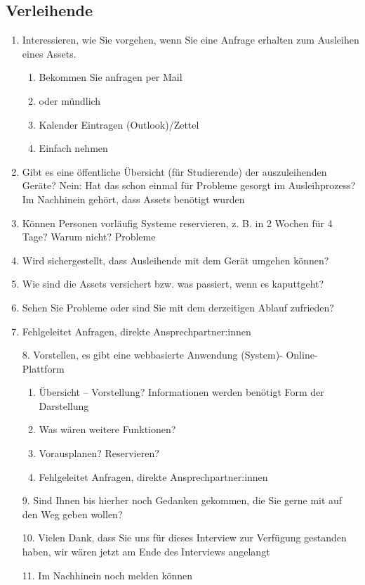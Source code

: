 \subsection{Verleihende}
{\sffamily\color{maincolor}{Abschnitt: Jetzt}}
\begin{enumerate}
    \item Interessieren, wie Sie vorgehen, wenn Sie eine Anfrage erhalten zum Ausleihen eines
          Assets.
          \begin{enumerate}
              \item Bekommen Sie anfragen per Mail
              \item oder mündlich
              \item Kalender Eintragen (Outlook)/Zettel
              \item Einfach nehmen
          \end{enumerate}
    \item Gibt es eine öffentliche Übersicht (für Studierende) der auszuleihenden Geräte? Nein: Hat
          das schon einmal für Probleme gesorgt im Ausleihprozess? Im Nachhinein gehört, dass Assets
          benötigt wurden
    \item Können Personen vorläufig Systeme reservieren, z. B. in 2 Wochen für 4 Tage?
          Warum nicht? Probleme
    \item Wird sichergestellt, dass Ausleihende mit dem Gerät umgehen können?
    \item Wie sind die Assets versichert bzw. was passiert, wenn es kaputtgeht?
    \item Sehen Sie Probleme oder sind Sie mit dem derzeitigen Ablauf zufrieden?
    \item Fehlgeleitet Anfragen, direkte Ansprechpartner:innen
\end{enumerate}

{\sffamily\color{maincolor}{Abschnitt: Visionen und Ziele}}
\begin{enumerate}
    \item[8.] Vorstellen, es gibt eine webbasierte Anwendung (System)- Online-Plattform
        \begin{enumerate}
            \item Übersicht – Vorstellung?
                  Informationen werden benötigt
                  Form der Darstellung
            \item Was wären weitere Funktionen?
            \item Vorausplanen? Reservieren?
            \item Fehlgeleitet Anfragen, direkte Ansprechpartner:innen
        \end{enumerate}
    \item[9.] Sind Ihnen bis hierher noch Gedanken gekommen, die Sie gerne mit auf den Weg geben wollen?
    \item[10.] Vielen Dank, dass Sie uns für dieses Interview zur Verfügung gestanden haben, wir wären jetzt am Ende des Interviews angelangt
    \item[11.] Im Nachhinein noch melden können
\end{enumerate}

